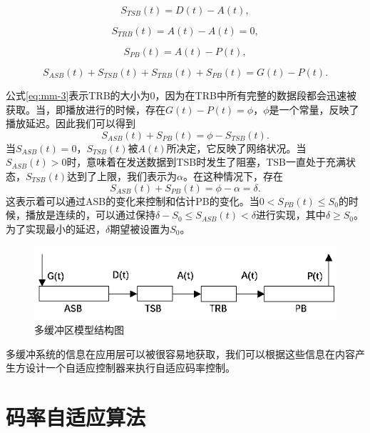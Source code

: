 \begin{equation}
\label{eq:mm-2}
S_{TSB}(t)=D(t)-A(t),
\end{equation}

\begin{equation}
\label{eq:mm-3}
S_{TRB}(t)=A(t)-A(t)=0,
\end{equation}

\begin{equation}
\label{eq:mm-4}
S_{PB}(t) =A(t)-P(t),
\end{equation}

\begin{equation}
\label{eq:mm-5}
S_{ASB}(t)+S_{TSB}(t)+S_{TRB}(t)+S_{PB}(t)=G(t)-P(t).
\end{equation}


公式\ref{eq:mm-3}表示TRB的大小为0，因为在TRB中所有完整的数据段都会迅速被获取。当，即播放进行的时候，存在$G(t)-P(t)=\phi$，$\phi$是一个常量，反映了播放延迟。因此我们可以得到
\begin{equation}
\label{eq:mm-6}
S_{ASB}(t)+S_{PB}(t)=\phi-S_{TSB}(t).
\end{equation}
当$S_{ASB}(t)=0$，$S_{TSB}(t)$被$A(t)$所决定，它反映了网络状况。当$S_{ASB}(t)>0$时，意味着在发送数据到TSB时发生了阻塞，TSB一直处于充满状态，$S_{TSB}(t)$达到了上限，我们表示为$\alpha$。在这种情况下，存在
\begin{equation}
\label{eq:mm-7}
S_{ASB}(t)+S_{PB}(t)=\phi-\alpha=\delta.
\end{equation}
这表示着可以通过ASB的变化来控制和估计PB的变化。当$0 < S_{PB}(t) \le S_0$的时候，播放是连续的，可以通过保持$\delta - S_0 \le S_{ASB}(t) < \delta$进行实现，其中$\delta \ge S_0$。为了实现最小的延迟，$\delta$期望被设置为$S_0$。

\begin{figure}[t]
	\centering
	\includegraphics[width = 0.8\linewidth]{clip/21.png}
	\caption{多缓冲区模型结构图\label{fig:21}}
\end{figure}

多缓冲系统的信息在应用层可以被很容易地获取，我们可以根据这些信息在内容产生方设计一个自适应控制器来执行自适应码率控制。


\section{码率自适应算法}

